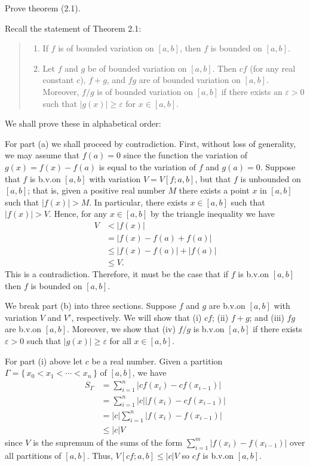 \begin{problem}
  Prove theorem (2.1).
\end{problem}
\begin{solution}
  Recall the statement of Theorem 2.1:
  \begin{quote}
    \begin{enumerate}[label=(\alph*),noitemsep]
    \item If $f$ is of bounded variation on $[a,b]$, then $f$ is bounded on
      $[a,b]$.
    \item Let $f$ and $g$ be of bounded variation on $[a,b]$. Then $cf$
      (for any real constant $c$), $f+g$, and $fg$ are of bounded variation
      on $[a,b]$. Moreover, $f/g$ is of bounded variation on $[a,b]$ if
      there exists an $\varepsilon>0$ such that $|g(x)|\geq\varepsilon$ for
      $x\in[a,b]$.
    \end{enumerate}
  \end{quote}
  \noindent%
  We shall prove these in alphabetical order:

  For part (a) we shall proceed by contradiction. First, without loss of
  generality, we may assume that $f(a)=0$ since the function the variation
  of $g(x)=f(x)-f(a)$ is equal to the variation of $f$ and $g(a)=0$.
  Suppose that $f$ is b.v.\@ on $[a,b]$ with variation $V=V[f;a,b]$, but
  that $f$ is unbounded on $[a,b]$; that is, given a positive real number
  $M$ there exists a point $x$ in $[a,b]$ such that $|f(x)|>M$. In
  particular, there exists $x\in[a,b]$ such that $|f(x)|>V$. Hence, for any
  $x\in[a,b]$ by the triangle inequality we have
  \begin{align*}
    V&<|f(x)|\\
     &=|f(x)-f(a)+f(a)|\\
     &\leq|f(x)-f(a)|+|f(a)|\\
     &\leq V.
  \end{align*}
  This is a contradiction. Therefore, it must be the case that if $f$ is
  b.v.\@ on $[a,b]$ then $f$ is bounded on $[a,b]$.

  We break part (b) into three sections. Suppose $f$ and $g$ are b.v.\@ on
  $[a,b]$ with variation $V$ and $V'$, respectively.  We will show that (i)
  $cf$; (ii) $f+g$; and (iii) $fg$ are b.v.\@ on $[a,b]$. Moreover, we show
  that (iv) $f/g$ is b.v.\@ on $[a,b]$ if there exists $\varepsilon>0$ such
  that $|g(x)|\geq\varepsilon$ for all $x\in[a,b]$.

  For part (i) above let $c$ be a real number. Given a partition
  $\Gamma=\{\,x_0<x_1<\cdots<x_n\,\}$ of $[a,b]$, we have
  \begin{align*}
    S_\Gamma
    &=\sum_{i=1}^n |cf(x_i)-cf(x_{i-1})|\\
    &=\sum_{i=1}^n |c||f(x_i)-cf(x_{i-1})|\\
    &=|c|\sum_{i=1}^n|f(x_i)-f(x_{i-1})|\\
    &\leq |c| V
  \end{align*}
  since $V$ is the supremum of the sums of the form
  $\sum_{i=1}^m|f(x_i)-f(x_{i-1})|$ over all partitions of $[a,b]$. Thus,
  $V[cf;a,b]\leq |c|V$ so $cf$ is b.v.\@ on $[a,b]$.


\end{solution}
